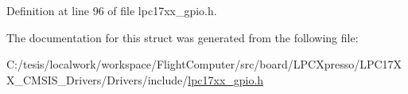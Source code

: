 \-Definition at line 96 of file lpc17xx\-\_\-gpio.\-h.



\-The documentation for this struct was generated from the following file\-:\begin{DoxyCompactItemize}
\item 
\-C\-:/tesis/localwork/workspace/\-Flight\-Computer/src/board/\-L\-P\-C\-Xpresso/\-L\-P\-C17\-X\-X\-\_\-\-C\-M\-S\-I\-S\-\_\-\-Drivers/\-Drivers/include/\hyperlink{lpc17xx__gpio_8h}{lpc17xx\-\_\-gpio.\-h}\end{DoxyCompactItemize}
